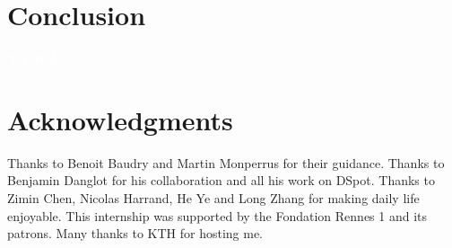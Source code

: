 \documentclass[11pt]{sdm_internship}
\newcommand{\todo}[1]{\colorbox{Red!75}{\textcolor{white}{\textbf{TODO\ifx&#1&\else: #1\fi}}}}
\newcommand{\dspot}{DSpot\xspace}
\theoremstyle{definition}
\begin{document}
\section*{Conclusion}%
\label{sec:conclu}%
\todo{}


\section*{Acknowledgments}%
\label{sec:ack}%
Thanks to Benoit Baudry and Martin Monperrus for their guidance.
Thanks to Benjamin Danglot for his collaboration and all his work on \dspot.
Thanks to Zimin Chen, Nicolas Harrand, He Ye and Long Zhang for making daily life enjoyable.
This internship was supported by the Fondation Rennes 1 and its patrons.
Many thanks to KTH for hosting me.


%

\end{document}
